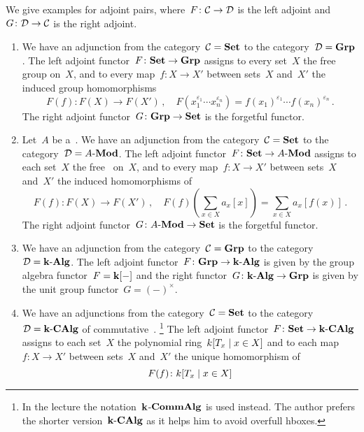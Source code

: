 \begin{example}
  We give examples for adjoint pairs, where~$F \colon \mathcal{C} \to \mathcal{D}$ is the left adjoint and~$G \colon \mathcal{D} \to \mathcal{C}$ is the right adjoint.
  \begin{enumerate}
    \item
      We have an adjunction from the category~$\mathcal{C} = \mathbf{Set}$ to the category~$\mathcal{D} = \mathbf{Grp}$.
      The left adjoint functor~$F \colon \mathbf{Set} \to \mathbf{Grp}$ assigns to every set~$X$ the free group on~$X$, and to every map~$f \colon X \to X'$ between sets~$X$ and~$X'$ the induced group homomorphisms
      \[
                F(f)
        \colon  F(X)
        \to     F(X') \,,
        \quad   F(x_1^{\varepsilon_1} \dotsm x_n^{\varepsilon_n})
        =       f(x_1)^{\varepsilon_1} \dotsm f(x_n)^{\varepsilon_n} \,.
      \]
      The right adjoint functor~$G \colon \mathbf{Grp} \to \mathbf{Set}$ is the forgetful functor.
    \item
      Let~$A$ be a~{\kalg}.
      We have an adjunction from the category~$\mathcal{C} = \mathbf{Set}$ to the category~$\mathcal{D} = \text{$A$-$\mathbf{Mod}$}$.
      The left adjoint functor~$F \colon \mathbf{Set} \to \text{$A$-$\mathbf{Mod}$}$ assigns to each set~$X$ the free~{} on~$X$, and to every map~$f \colon X \to X'$ between sets~$X$ and~$X'$ the induced homomorphisms of~{}
      \[
                F(f)
        \colon  F(X)
        \to     F(X') \,,
        \quad   F(f)\left( \sum_{x \in X} a_x [x] \right)
        =       \sum_{x \in X} a_x [f(x)] \,.
      \]
      The right adjoint functor~$G \colon \text{$A$-$\mathbf{Mod}$} \to \mathbf{Set}$ is the forgetful functor.
    \item
      We have an adjunction from the category~$\mathcal{C} = \mathbf{Grp}$ to the category~$\mathcal{D} = \text{$\mathbf{k}$-$\mathbf{Alg}$}$.
      The left adjoint functor~$F \colon \mathbf{Grp} \to \text{$\mathbf{k}$-$\mathbf{Alg}$}$ is given by the group algebra functor~$F = \mathbf{k}[-]$ and the right functor~$G \colon \text{$\mathbf{k}$-$\mathbf{Alg}$} \to \mathbf{Grp}$ is given by the unit group functor~$G = (-)^\times$.
    \item
      We have an adjunctions from the category~$\mathcal{C} = \mathbf{Set}$ to the category~$\mathcal{D} = \text{$\mathbf{k}$-$\mathbf{CAlg}$}$ of commutative~{\kalgs}.%
      \footnote{In the lecture the notation~$\mathbf{k}$\nobreakdash-$\mathbf{CommAlg}$ is used instead.
      The author prefers the shorter version~$\text{$\mathbf{k}$-$\mathbf{CAlg}$}$ as it helps him to avoid overfull hboxes.}
      The left adjoint functor~$F \colon \mathbf{Set} \to \text{$\mathbf{k}$-$\mathbf{CAlg}$}$ assigns to each set~$X$ the polynomial ring~$k[T_x \suchthat x \in X]$ and to each map~$f \colon X \to X'$ between sets~$X$ and~$X'$ the unique homomorphism of~{\kalgs}
      \[
                F(f)
        \colon  k[T_x \suchthat x \in X]
\]
\end{enumerate}
\end{example}
